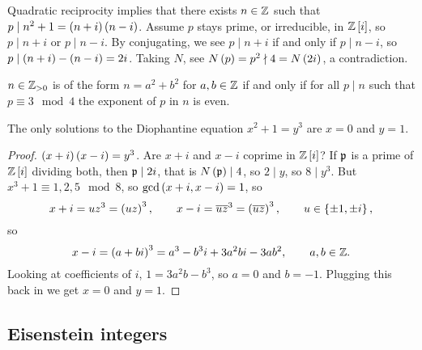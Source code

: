 
Quadratic reciprocity implies that there exists $ n \in \mathbb{Z} $ such that $ p \mid n^2 + 1 = \br{n + i}\br{n - i} $. Assume $ p $ stays prime, or irreducible, in $ \Z\sbr{i} $, so $ p \mid n + i $ or $ p \mid n - i $. By conjugating, we see $ p \mid n + i $ if and only if $ p \mid n - i $, so $ p \mid \br{n + i} - \br{n - i} = 2i $. Taking $ N $, see $ N\br{p} = p^2 \nmid 4 = N\br{2i} $, a contradiction.

\begin{theorem}
$ n \in \mathbb{Z}_{> 0} $ is of the form $ n = a^2 + b^2 $ for $ a, b \in \mathbb{Z} $ if and only if for all $ p \mid n $ such that $ p \equiv 3 \mod 4 $ the exponent of $ p $ in $ n $ is even.
\end{theorem}

\pagebreak

\begin{theorem}
The only solutions to the Diophantine equation $ x^2 + 1 = y^3 $ are $ x = 0 $ and $ y = 1 $.
\end{theorem}

\begin{proof}
$ \br{x + i}\br{x - i} = y^3 $. Are $ x + i $ and $ x - i $ coprime in $ \Z\sbr{i} $? If $ \mathfrak{p} $ is a prime of $ \Z\sbr{i} $ dividing both, then $ \mathfrak{p} \mid 2i $, that is $ N\br{\pp} \mid 4 $, so $ 2 \mid y $, so $ 8 \mid y^3 $. But $ x^3 + 1 \equiv 1, 2, 5 \mod 8 $, so $ \gcd\br{x + i, x - i} = 1 $, so
$$ x + i = uz^3 = \br{uz}^3, \qquad x - i = \overline{u}\overline{z}^3 = \br{\overline{u}\overline{z}}^3, \qquad u \in \cbr{\pm 1, \pm i}, $$
so
$$ x - i = \br{a + bi}^3 = a^3 - b^3i + 3a^2bi - 3ab^2, \qquad a, b \in \Z. $$
Looking at coefficients of $ i $, $ 1 = 3a^2b - b^3 $, so $ a = 0 $ and $ b = -1 $. Plugging this back in we get $ x = 0 $ and $ y = 1 $.
\end{proof}

\subsection{Eisenstein integers}

